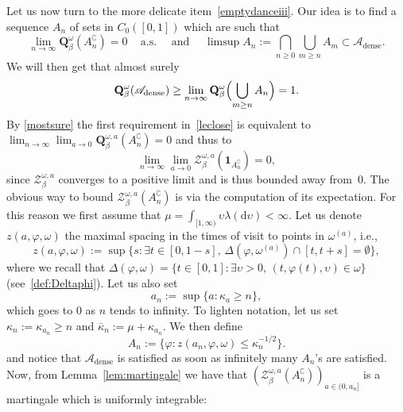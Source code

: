 \documentclass[11pt]{article}
\newcommand{\ie}{i.e.,\xspace}
\numberwithin{equation}{section}
\let\mathcal\mathscr
\let\sep:
\theoremstyle{definition}
\newcommand{\dd}{\mathrm{d}}
\newcommand{\ind}{\mathbf{1}}
\let\cc\complement
\newcommand{\cA}{{\ensuremath{\mathcal A}} }
\newcommand{\cZ}{{\ensuremath{\mathcal Z}} }
\newcommand{\bQ}{{\ensuremath{\mathbf Q}} }
\let\gb\beta
\let\gl\lambda
\let\ups\upsilon
\let\go\omega
\begin{document}
Let us now turn to the more delicate item~\eqref{emptydanceiii}.
Our idea is to find a sequence $A_{n}$ of sets in $C_0([0,1])$ which are such that
\begin{equation}\label{leclose}
\lim_{n\to\infty} \bQ^{\go}_{\gb}(A_n^{\cc}) =0 \, \quad \text{a.s.} \quad
\text{ and } \quad
\limsup A_{n} := \bigcap_{n\ge 0} \bigcup_{m\ge n} A_m\subset \cA_{\mathrm{dense}}.
\end{equation}
We will then get that almost surely
\begin{equation}
\bQ^{\go}_\beta (\cA_{\mathrm{dense}})\ge \lim_{n\to \infty } \bQ^{\go}_\beta \Bigl(\bigcup_{m\ge n} A_{n}\Bigr)=1.
\end{equation}
By \eqref{mostsure} the first requirement in~\eqref{leclose} is equivalent to
$\lim_{n\to\infty} \lim_{a\to 0} \bQ^{\go,a}_\beta (A^{\cc}_{n}) =0$
and thus to
\begin{equation}
\label{Zan}
\lim_{n\to\infty} \lim_{a\to 0} \cZ^{\go,a}_\beta (\ind_{A^{\cc}_{n}}) =0,
\end{equation}
since $\cZ^{\go,a}_\beta$
converges to a positive limit and is thus bounded away from~$0$.
The obvious way to bound $\cZ^{\go,a}_\beta (A^{\cc}_{n})$ is via the computation of its expectation. For this reason we first assume
that $\mu=\int_{[1,\infty)}\ups \gl (\dd \ups)<\infty$. Let
us denote $z(a,\varphi,\go)$ the maximal spacing in the times of visit to points in $\go^{(a)}$, \ie 
\begin{equation*}
z(a,\varphi,\go):= \sup \bigl\{ s \sep \exists t\in [0,1-s], \, \varDelta(\varphi,\go^{(a)})\cap[t,t+s]=\emptyset\bigr\},
\end{equation*}
where we recall that $\varDelta (\varphi, \go) = \{t\in [0,1] \sep \exists \ups>0,\, (t,\varphi(t),\ups) \in \go\} $ (see~\eqref{def:Deltaphi}).
Let us also set
\begin{equation*}
a_n:= \sup \{ a \sep \kappa_a \ge n \},
\end{equation*}
which goes to $0$ as $n$ tends to infinity.
To lighten notation, let us set $ \kappa_n:= \kappa_{a_n} \geq n$ and $\bar \kappa_n:= \mu+ \kappa_{a_n}$.
We then define
\begin{equation}
A_{n}:= \bigl\{ \varphi \sep z(a_n,\varphi,\go) \le \kappa_n^{-1/2} \bigr\}.
\end{equation}
and notice that $\cA_{\mathrm{dense}}$ is satisfied as soon as infinitely many $A_{n}$'s are satisfied. Now, from Lemma~\ref{lem:martingale} we have that $(\cZ^{\go, a }_{\beta}(A_{n}^{\cc}))_{a\in(0,a_n]}$ is a martingale which is uniformly integrable:
\end{document}
